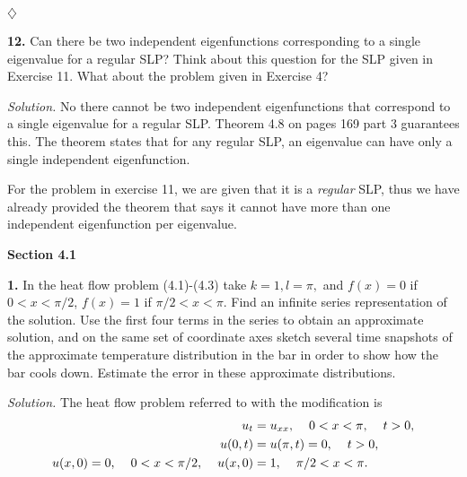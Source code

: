 \documentclass{article}
\begin{document}
\begin{flushright}
\( \diamondsuit \)
\end{flushright}




\newpage
\textbf{12. } Can there be two independent eigenfunctions corresponding to a single eigenvalue for a regular SLP? Think about this question for the SLP given in Exercise 11. What about the problem given in Exercise 4?





\vspace{3mm}
\textit{Solution.} No there cannot be two independent eigenfunctions that correspond to a single eigenvalue for a regular SLP. Theorem 4.8 on pages 169 part 3 guarantees this. The theorem states that for any regular SLP, an eigenvalue  can have only a single independent eigenfunction. 


\vspace{3mm}
For the problem in exercise 11, we are given that it is a \textit{regular} SLP, thus we have already provided the theorem that says it cannot have more than one independent eigenfunction per eigenvalue. 











\newpage
\textbf{Section 4.1}


\textbf{1.} In the heat flow problem (4.1)-(4.3) take \(k=1, l =\pi,\) and \(f(x) = 0\) if \(0<x<\pi/2\), \(f(x)=1 \) if \( \pi/2 <x<\pi\). Find an infinite series representation of the solution. Use the first four terms in the series to obtain an approximate solution, and on the same set of coordinate axes sketch several time snapshots of the approximate temperature distribution in the bar in order to show how the bar cools down. Estimate the error in these approximate distributions. 




\vspace{3mm}
\textit{Solution.} The heat flow problem referred to with the modification is
\begin{align}
u_t&=u_{xx}, \hspace{4mm} 0<x<\pi, \hspace{4mm}t>0, \\
u(0,t)&=u(\pi,t) =0, \hspace{4mm}t>0, \\
u(x,0)=0,  \hspace{4mm} 0<x<\pi/2, \hspace{4mm} u(x,0)&= 1, \hspace{4mm} \pi/2 < x<\pi.
\end{align}
\end{document}
